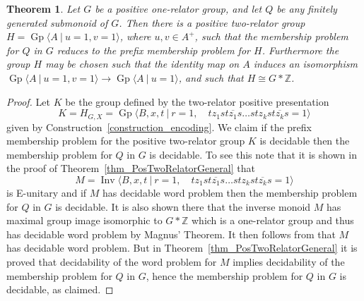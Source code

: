 \documentclass{amsart}
\newcommand{\Gpres}[2]{\operatorname{Gp}\bigl\langle #1\:|\:#2 \bigr\rangle}
\newcommand{\Ipres}[2]{\operatorname{Inv}\bigl\langle #1\:|\:#2 \bigr\rangle}
\theoremstyle{plain}
\newtheorem{theorem}{Theorem}[section]
\theoremstyle{definition}
\begin{document}
\begin{theorem}
\label{thm_TwoRelator} 
Let $G$ be a positive one-relator group, and let $Q$ be any finitely generated submonoid of $G$. 
Then there is a positive two-relator group $H=\Gpres{A}{u=1, v=1}$, where $u, v \in A^+$, 
such that the membership problem for $Q$ in $G$ reduces to the prefix membership problem for $H$. 
Furthermore the group $H$ may be chosen such that the identity map on $A$ induces an isomorphism 
$\Gpres{A}{u=1, v=1} \rightarrow \Gpres{A}{u=1}$, and such that $H \cong G \ast \mathbb{Z}$.   
\end{theorem}
\begin{proof} 
Let $K$ be the group defined by the two-relator positive presentation  
\[
K = H_{G,X} =  
\Gpres{B,x,t}{
r = 1, \quad 
t z_1 s t\overline{z_1} s  \ldots  s t z_k s t\overline{z_k} s = 1
}
\]
given by Construction~\ref{construction_encoding}.
We claim if the prefix membership problem for the positive two-relator group $K$ is decidable then the membership problem for $Q$ in $G$ is decidable. 
To see this note that it is shown in the proof of  Theorem~\ref{thm_PosTwoRelatorGeneral} that 
\[
M = 
\Ipres{B,x,t}{
r = 1, \quad 
t z_1 s t\overline{z_1} s  \ldots  s t z_k s t\overline{z_k} s = 1
}
\]
is E-unitary and if $M$ has decidable word problem then   
the membership problem for $Q$ in $G$ is decidable.   
It is also shown there that the inverse monoid $M$ has maximal group image isomorphic to  
$G \ast \mathbb{Z}$ which is a one-relator group and thus    
has decidable word problem by Magnus' Theorem. 
It then follows from 
\cite[Theorem~3.3]{Ivanov2001} 
that $M$ has decidable word problem. 
But in Theorem~\ref{thm_PosTwoRelatorGeneral} it is proved that decidability of the word problem for $M$ implies decidability of the membership problem for $Q$ in $G$, hence the membership problem for $Q$ in $G$ is decidable, as claimed.  


\end{proof}
\end{document}

